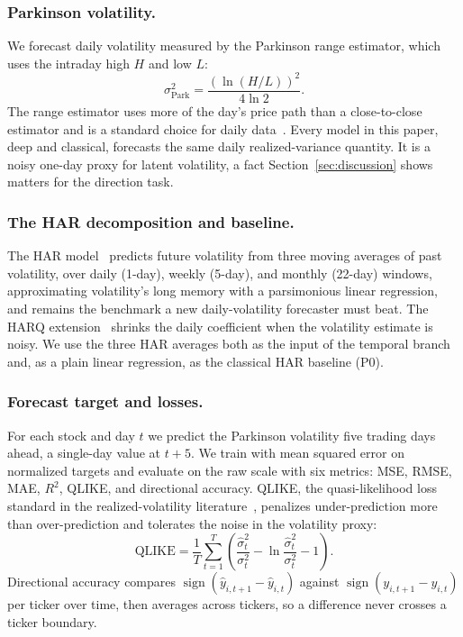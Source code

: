 \documentclass[runningheads]{llncs}
\begin{document}
\subsubsection{Parkinson volatility.}
We forecast daily volatility measured by the Parkinson range estimator, which uses the intraday high $H$
and low $L$:
\begin{equation}
\sigma^2_{\text{Park}} = \frac{\left(\ln(H/L)\right)^2}{4\ln 2}.
\label{eq:parkinson}
\end{equation}
The range estimator uses more of the day's price path than a close-to-close estimator and is a standard
choice for daily data~\cite{parkinson1980}. Every model in this paper, deep and classical, forecasts the
same daily realized-variance quantity. It is a noisy one-day proxy for latent volatility, a fact
Section~\ref{sec:discussion} shows matters for the direction task.

\subsubsection{The HAR decomposition and baseline.}
The HAR model~\cite{corsi2009} predicts future volatility from three moving averages of past volatility,
over daily (1-day), weekly (5-day), and monthly (22-day) windows, approximating volatility's long memory
with a parsimonious linear regression, and remains the benchmark a new daily-volatility forecaster must
beat. The HARQ extension~\cite{bpq2016} shrinks the daily coefficient when the volatility estimate is
noisy. We use the three HAR averages both as the input of the temporal branch and, as a plain linear
regression, as the classical HAR baseline (P0).

\subsubsection{Forecast target and losses.}
For each stock and day $t$ we predict the Parkinson volatility five trading days ahead, a single-day
value at $t+5$. We train with mean squared error on normalized targets and evaluate on the raw scale with
six metrics: MSE, RMSE, MAE, $R^2$, QLIKE, and directional accuracy. QLIKE, the quasi-likelihood loss
standard in the realized-volatility literature~\cite{patton2011}, penalizes under-prediction more than
over-prediction and tolerates the noise in the volatility proxy:
\begin{equation}
\text{QLIKE} = \frac{1}{T}\sum_{t=1}^{T}\left(\frac{\hat{\sigma}^2_t}{\sigma^2_t}
 - \ln\frac{\hat{\sigma}^2_t}{\sigma^2_t} - 1\right).
\label{eq:qlike}
\end{equation}
Directional accuracy compares $\operatorname{sign}(\hat{y}_{i,t+1}-\hat{y}_{i,t})$ against
$\operatorname{sign}(y_{i,t+1}-y_{i,t})$ per ticker over time, then averages across tickers, so a
difference never crosses a ticker boundary.
\end{document}
